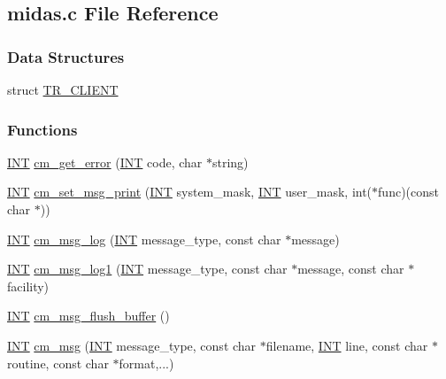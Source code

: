 \subsection{midas.c File Reference}
\label{midas_8c}
\subsubsection*{Data Structures}
\begin{DoxyCompactItemize}
\item 
struct \hyperlink{structTR__CLIENT}{TR\_\-CLIENT}
\end{DoxyCompactItemize}
\subsubsection*{Functions}
\begin{DoxyCompactItemize}
\item 
\hyperlink{vppg_8h_a392e62da233ed3e2f7c3fd4f487a3896}{INT} \hyperlink{group__msgfunctionc_ga42f4420ba3e5b4663f3fdd80a586841e}{cm\_\-get\_\-error} (\hyperlink{vppg_8h_a392e62da233ed3e2f7c3fd4f487a3896}{INT} code, char $\ast$string)
\item 
\hyperlink{vppg_8h_a392e62da233ed3e2f7c3fd4f487a3896}{INT} \hyperlink{group__msgfunctionc_gafe6ff62436845805cd87a7ea1bd3b4dd}{cm\_\-set\_\-msg\_\-print} (\hyperlink{vppg_8h_a392e62da233ed3e2f7c3fd4f487a3896}{INT} system\_\-mask, \hyperlink{vppg_8h_a392e62da233ed3e2f7c3fd4f487a3896}{INT} user\_\-mask, int($\ast$func)(const char $\ast$))
\item 
\hyperlink{vppg_8h_a392e62da233ed3e2f7c3fd4f487a3896}{INT} \hyperlink{group__msgfunctionc_gadac7f1f490117d6cdd4fc39bd7f9d0d5}{cm\_\-msg\_\-log} (\hyperlink{vppg_8h_a392e62da233ed3e2f7c3fd4f487a3896}{INT} message\_\-type, const char $\ast$message)
\item 
\hyperlink{vppg_8h_a392e62da233ed3e2f7c3fd4f487a3896}{INT} \hyperlink{group__msgfunctionc_gacc533051c0100cc554cd28314079e71c}{cm\_\-msg\_\-log1} (\hyperlink{vppg_8h_a392e62da233ed3e2f7c3fd4f487a3896}{INT} message\_\-type, const char $\ast$message, const char $\ast$facility)
\item 
\hyperlink{vppg_8h_a392e62da233ed3e2f7c3fd4f487a3896}{INT} \hyperlink{group__msgfunctionc_gaa28e2fd30622699b67e7b0116da2923c}{cm\_\-msg\_\-flush\_\-buffer} ()
\item 
\hyperlink{vppg_8h_a392e62da233ed3e2f7c3fd4f487a3896}{INT} \hyperlink{group__msgfunctionc_gaac032ca2438c47466bfc9722de6746ea}{cm\_\-msg} (\hyperlink{vppg_8h_a392e62da233ed3e2f7c3fd4f487a3896}{INT} message\_\-type, const char $\ast$filename, \hyperlink{vppg_8h_a392e62da233ed3e2f7c3fd4f487a3896}{INT} line, const char $\ast$routine, const char $\ast$format,...)

\end{DoxyCompactItemize}
